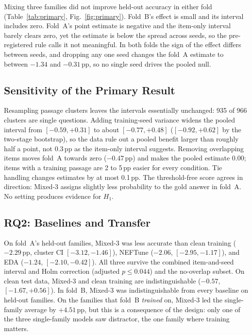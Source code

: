 \documentclass[conference]{IEEEtran}
\newcommand{\ppts}{\,pp}
\newcommand{\pfam}[1]{\textsf{#1}}
\begin{document}
Mixing three families did not improve held-out accuracy in either fold (Table~\ref{tab:primary}, Fig.~\ref{fig:primary}). Fold~B's effect is small and its interval includes zero. Fold~A's point estimate is negative and the item-only interval barely clears zero, yet the estimate is below the spread across seeds, so the pre-registered rule calls it not meaningful. In both folds the sign of the effect differs between seeds, and dropping any one seed changes the fold~A estimate to between $-1.34$ and $-0.31$\ppts{}, so no single seed drives the pooled null.

\subsection{Sensitivity of the Primary Result}
\label{sec:sens}
Resampling passage clusters leaves the intervals essentially unchanged: 935 of 966 clusters are single questions. Adding training-seed variance widens the pooled interval from $[-0.59, +0.31]$ to about $[-0.77, +0.48]$ ($[-0.92, +0.62]$ by the two-stage bootstrap), so the data rule out a pooled benefit larger than roughly half a point, not 0.3\ppts{} as the item-only interval suggests. Removing overlapping items moves fold~A towards zero ($-0.47$\ppts{}) and makes the pooled estimate $0.00$; items with a training passage are 2 to 5\ppts{} easier for every condition. Tie handling changes estimates by at most 0.1\ppts{}. The threshold-free score agrees in direction: Mixed-3 assigns slightly less probability to the gold answer in fold~A. No setting produces evidence for $H_1$.

\subsection{RQ2: Baselines and Transfer}
\label{sec:secondary}
On fold~A's held-out families, Mixed-3 was less accurate than clean training ($-2.29$\ppts{}, cluster CI $[-3.12, -1.46]$), NEFTune ($-2.06$, $[-2.95, -1.17]$), and EDA ($-1.24$, $[-2.10, -0.42]$). All three survive the combined item-and-seed interval and Holm correction (adjusted $p \leq 0.044$) and the no-overlap subset. On clean test data, Mixed-3 and clean training are indistinguishable ($-0.57$, $[-1.67, +0.56]$). In fold~B, Mixed-3 was indistinguishable from every baseline on held-out families. On the families that fold~B \emph{trained} on, Mixed-3 led the single-family average by $+4.51$\ppts{}, but this is a consequence of the design: only one of the three single-family models saw \pfam{distractor}, the one family where training matters.
\end{document}
